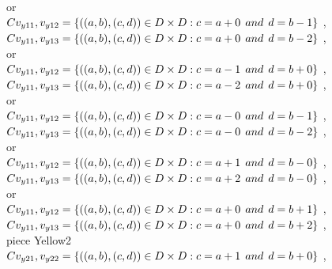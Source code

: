 \\or
\\$C{v_{y11},v_{y12}}=\{((a,b),(c,d))\in D\times D: c = a + 0\hspace{1ex} and \hspace{1ex}  d = b - 1 \}$ , 
\\$C{v_{y11},v_{y13}}=\{((a,b),(c,d))\in D\times D: c = a + 0\hspace{1ex} and \hspace{1ex}  d = b - 2 \}$ , 
\\or
\\$C{v_{y11},v_{y12}}=\{((a,b),(c,d))\in D\times D: c = a - 1\hspace{1ex} and \hspace{1ex}  d = b + 0 \}$ , 
\\$C{v_{y11},v_{y13}}=\{((a,b),(c,d))\in D\times D: c = a - 2\hspace{1ex} and \hspace{1ex}  d = b + 0 \}$ , 
\\or
\\$C{v_{y11},v_{y12}}=\{((a,b),(c,d))\in D\times D: c = a - 0\hspace{1ex} and \hspace{1ex}  d = b - 1 \}$ , 
\\$C{v_{y11},v_{y13}}=\{((a,b),(c,d))\in D\times D: c = a - 0\hspace{1ex} and \hspace{1ex}  d = b - 2 \}$ , 
\\or
\\$C{v_{y11},v_{y12}}=\{((a,b),(c,d))\in D\times D: c = a + 1\hspace{1ex} and \hspace{1ex}  d = b - 0 \}$ , 
\\$C{v_{y11},v_{y13}}=\{((a,b),(c,d))\in D\times D: c = a + 2\hspace{1ex} and \hspace{1ex}  d = b - 0 \}$ , 
\\or
\\$C{v_{y11},v_{y12}}=\{((a,b),(c,d))\in D\times D: c = a + 0\hspace{1ex} and \hspace{1ex}  d = b + 1 \}$ , 
\\$C{v_{y11},v_{y13}}=\{((a,b),(c,d))\in D\times D: c = a + 0\hspace{1ex} and \hspace{1ex}  d = b + 2 \}$ , 
\\ piece Yellow2
\\$C{v_{y21},v_{y22}}=\{((a,b),(c,d))\in D\times D: c = a + 1\hspace{1ex} and \hspace{1ex}  d = b + 0 \}$ , 
